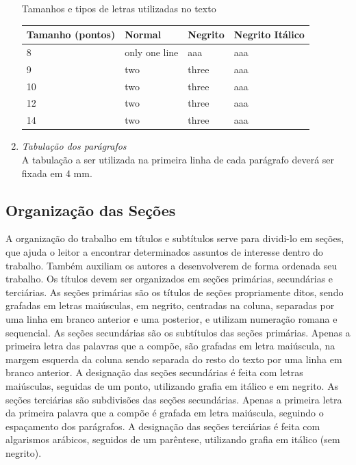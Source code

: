 \documentclass{ceel}
\begin{document}
\begin{multicols}{2}
\begin{enumerate}[1)]
\begin{minipage}[h]{\columnwidth}
\centering
\begin{footnotesize}
\captionsetup{type=table}
\caption{Tamanhos e tipos de letras utilizadas no texto}
\begin{tabular}{p{1cm}p{1.8cm}p{1.8cm}p{1.8cm}}\hline
\textbf{Tamanho (pontos)}&	\textbf{Normal}&\textbf{Negrito} & \textbf{Negrito Itálico} \\\hline
8 & only one line&  aaa  &  aaa\\ \hline
9 & two & three&  aaa \\\hline
10 & two & three &  aaa\\\hline
12 & two & three &  aaa\\\hline
14 & two & three &  aaa\\\hline
\end{tabular}
\end{footnotesize}
\end{minipage}
\item \emph{Tabulação dos parágrafos}\\
A tabulação a ser utilizada na primeira linha de cada parágrafo deverá ser fixada em 4 mm.
\end{enumerate}

\subsection{Organização das Seções}
A organização do trabalho em títulos e subtítulos serve para dividi-lo em seções, que ajuda o leitor a encontrar determinados assuntos de interesse dentro do trabalho. Também auxiliam os autores a desenvolverem de forma ordenada seu trabalho. Os títulos devem ser organizados em seções primárias, secundárias e terciárias.
As seções primárias são os títulos de seções propriamente ditos, sendo grafadas em letras maiúsculas, em negrito, centradas na coluna, separadas por uma linha em branco anterior e uma posterior, e utilizam numeração romana e sequencial.
As seções secundárias são os subtítulos das seções primárias. Apenas a primeira letra das palavras que a compõe, são grafadas em letra maiúscula, na margem esquerda da coluna sendo separada do resto do texto por uma linha em branco anterior. A designação das seções secundárias é feita com letras maiúsculas, seguidas de um ponto, utilizando grafia em itálico e em negrito.
As seções terciárias são subdivisões das seções secundárias. Apenas a primeira letra da primeira palavra que a compõe é grafada em letra maiúscula, seguindo o espaçamento dos parágrafos. A designação das seções terciárias é feita com algarismos arábicos, seguidos de um parêntese, utilizando grafia em itálico (sem negrito).

\end{multicols}
\end{document}
